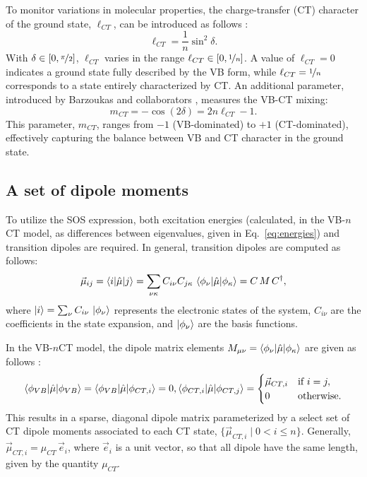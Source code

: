 \documentclass[12pt,a4paper]{article}
\begin{document}
To monitor variations in molecular properties, the charge-transfer (CT) character of the ground state, $\ell_{CT}$, can be introduced as follows \cite{choNonlinearOpticalProperties2002,choElementaryDescriptionNonlinear1998,yangLargeOffDiagonalContribution2003}:
\begin{equation}
	\ell_{CT} = \frac{1}{n} \sin^2 \delta.
\end{equation}
With $\delta \in [0, \nicefrac{\pi}{2}]$, $\ell_{CT}$ varies in the range $\ell_{CT} \in [0, \nicefrac{1}{n}]$. A value of $\ell_{CT} = 0$ indicates a ground state fully described by the VB form, while $\ell_{CT} = \nicefrac{1}{n}$ corresponds to a state entirely characterized by CT. 
An additional parameter, introduced by Barzoukas and collaborators \cite{barzoukasTWOFORMDESCRIPTIONPUSHPULL1996,barzoukasTwostateDescriptionHyper1996,blanchard-desceTwoformTwostateAnalysis1998a}, measures the VB-CT mixing:
\begin{equation}
	m_{CT} = -\cos(2\delta) = 2n \ell_{CT} - 1.
\end{equation} 
This parameter, $m_{CT}$, ranges from $-1$ (VB-dominated) to $+1$ (CT-dominated), effectively capturing the balance between VB and CT character in the ground state.

\subsection{A set of dipole moments}\label{sec:dipoles}

To utilize the SOS expression, both excitation energies (calculated, in the VB-$n$CT model, as differences between eigenvalues, given in Eq.~\eqref{eq:energies}) and transition dipoles are required. In general, transition dipoles are computed as follows:
\begin{equation}
	\vec{\mu}_{ij} = \braket{i | \hat{\mu} | j} = \sum_{\nu \kappa} C_{i \nu} C_{j \kappa} \, \braket{\phi_\nu | \hat{\mu} | \phi_\kappa} = C\,M\,C^\dagger,
\end{equation}
where $\ket{i} = \sum_\nu C_{i \nu} \, \ket{\phi_\nu}$ represents the electronic states of the system, $C_{i \nu}$ are the coefficients in the state expansion, and $\ket{\phi_\nu}$ are the basis functions. 

In the VB-$n$CT model, the dipole matrix elements $M_{\mu \nu} = \braket{\phi_\nu | \hat{\mu} | \phi_\kappa}$ are given as follows \cite{luValenceBondChargeTransferModel1994}:
\begin{align}
	\braket{\phi_{VB} | \hat{\mu} | \phi_{VB}} = \braket{\phi_{VB} | \hat{\mu} | \phi_{CT,i}} = 0,
	\braket{\phi_{CT,i} | \hat{\mu} | \phi_{CT,j}} = 
	\begin{cases}
		\vec{\mu}_{CT,i} & \text{if } i = j, \\
		0 & \text{otherwise}.
	\end{cases}
\end{align}
This results in a sparse, diagonal dipole matrix parameterized by a select set of CT dipole moments associated to each CT state, $\{\vec{\mu}_{CT,i} \mid 0 < i \leq n\}$. Generally, $\vec\mu_{CT, i} = \mu_{CT}\,\vec{e}_i$, where $\vec  e_i$ is a unit vector, so that all dipole have the same length, given by the quantity $\mu_{CT}$.
\end{document}
